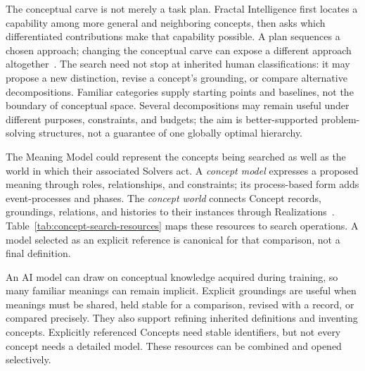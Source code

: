 \documentclass[10pt]{article}
\begin{document}
The conceptual carve is not merely a task plan. Fractal Intelligence first
locates a capability among more general and neighboring concepts, then asks
which differentiated contributions make that capability possible. A plan
sequences a chosen approach; changing the conceptual carve can expose a
different approach altogether~\cite{westerbergFractal2026}. The search need not
stop at inherited human classifications: it may propose a new distinction,
revise a concept's grounding, or compare alternative decompositions. Familiar
categories supply starting points and baselines, not the boundary of conceptual
space. Several decompositions may remain useful under different purposes,
constraints, and budgets; the aim is better-supported problem-solving
structures, not a guarantee of one globally optimal hierarchy.

The Meaning Model could represent the concepts being searched as well as the
world in which their associated Solvers act. A \emph{concept model} expresses
a proposed meaning through roles, relationships, and constraints; its
process-based form adds event-processes and phases. The \emph{concept world}
connects Concept records, groundings, relations, and histories to their
instances through Realizations~\cite{westerbergMeaning2026}.
Table~\ref{tab:concept-search-resources} maps these resources to search
operations. A model selected as an explicit reference is canonical for that
comparison, not a final definition.

An AI model can draw on conceptual knowledge acquired during training, so
many familiar meanings can remain implicit. Explicit groundings are useful
when meanings must be shared, held stable for a comparison, revised with a
record, or compared precisely. They also support refining inherited definitions
and inventing concepts. Explicitly referenced Concepts need stable identifiers,
but not every concept needs a detailed model. These resources can be combined
and opened selectively.
\end{document}
